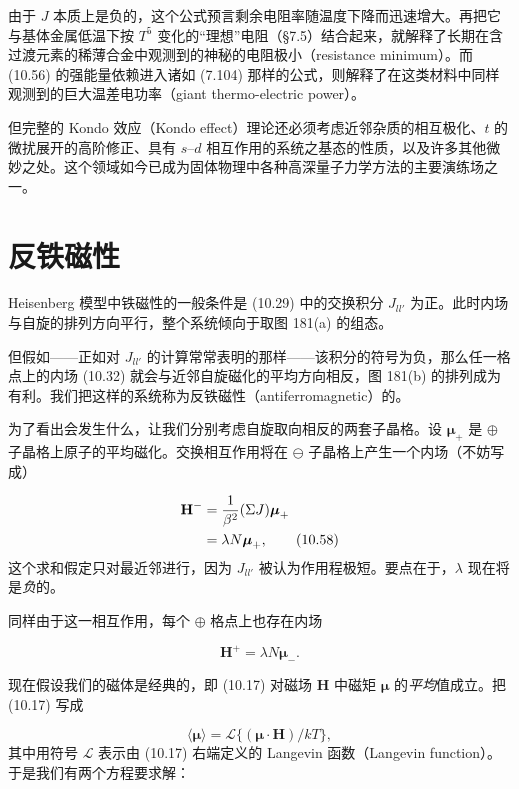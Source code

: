 由于 $J$ 本质上是负的，这个公式预言剩余电阻率随温度下降而迅速增大。再把它与基体金属低温下按 $T^5$ 变化的“理想”电阻（§7.5）结合起来，就解释了长期在含过渡元素的稀薄合金中观测到的神秘的电阻极小（resistance minimum）。而 (10.56) 的强能量依赖进入诸如 (7.104) 那样的公式，则解释了在这类材料中同样观测到的巨大温差电功率（giant thermo-electric power）。

但完整的 Kondo 效应（Kondo effect）理论还必须考虑近邻杂质的相互极化、$t$ 的微扰展开的高阶修正、具有 $s$–$d$ 相互作用的系统之基态的性质，以及许多其他微妙之处。这个领域如今已成为固体物理中各种高深量子力学方法的主要演练场之一。


\section{反铁磁性}

Heisenberg 模型中铁磁性的一般条件是 (10.29) 中的交换积分 $J_{ll'}$ 为正。此时内场与自旋的排列方向平行，整个系统倾向于取图 181(a) 的组态。

但假如——正如对 $J_{ll'}$ 的计算常常表明的那样——该积分的符号为负，那么任一格点上的内场 (10.32) 就会与近邻自旋磁化的平均方向相反，图 181(b) 的排列成为有利。我们把这样的系统称为反铁磁性（antiferromagnetic）的。

为了看出会发生什么，让我们分别考虑自旋取向相反的两套子晶格。设
$\boldsymbol{\mu}_+$ 是 $\oplus$ 子晶格上原子的平均磁化。交换相互作用将在 $\ominus$ 子晶格上产生一个内场（不妨写成）

\begin{align*}
\mathbf{H}^- &= \frac{1}{\beta^2}(\Sigma J)\boldsymbol{\mu}_+ \notag \\
&= \lambda N \boldsymbol{\mu}_+, \tag{10.58}
\end{align*}
这个求和假定只对最近邻进行，因为 $J_{ll'}$ 被认为作用程极短。要点在于，$\lambda$ 现在将是\emph{负}的。

同样由于这一相互作用，每个 $\oplus$ 格点上也存在内场

\begin{equation*}
\mathbf{H}^+ = \lambda N \boldsymbol{\mu}_-. \tag{10.59}
\end{equation*}

现在假设我们的磁体是经典的，即 (10.17) 对磁场 $\mathbf{H}$ 中磁矩 $\boldsymbol{\mu}$ 的\emph{平均}值成立。把 (10.17) 写成

\begin{equation*}
\langle \boldsymbol{\mu} \rangle = \mathcal{L}\{(\boldsymbol{\mu}\cdot\mathbf{H})/kT\}, \tag{10.60}
\end{equation*}
其中用符号 $\mathcal{L}$ 表示由 (10.17) 右端定义的 Langevin 函数（Langevin function）。于是我们有两个方程要求解：

